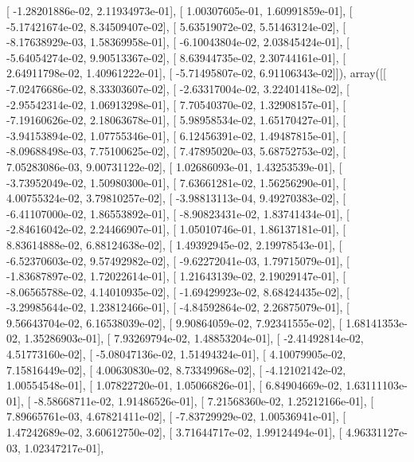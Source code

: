 \documentclass{article}
\begin{document}
       [ -1.28201886e-02,   2.11934973e-01],
       [  1.00307605e-01,   1.60991859e-01],
       [ -5.17421674e-02,   8.34509407e-02],
       [  5.63519072e-02,   5.51463124e-02],
       [ -8.17638929e-03,   1.58369958e-01],
       [ -6.10043804e-02,   2.03845424e-01],
       [ -5.64054274e-02,   9.90513367e-02],
       [  8.63944735e-02,   2.30744161e-01],
       [  2.64911798e-02,   1.40961222e-01],
       [ -5.71495807e-02,   6.91106343e-02]]), array([[ -7.02476686e-02,   8.33303607e-02],
       [ -2.63317004e-02,   3.22401418e-02],
       [ -2.95542314e-02,   1.06913298e-01],
       [  7.70540370e-02,   1.32908157e-01],
       [ -7.19160626e-02,   2.18063678e-01],
       [  5.98958534e-02,   1.65170427e-01],
       [ -3.94153894e-02,   1.07755346e-01],
       [  6.12456391e-02,   1.49487815e-01],
       [ -8.09688498e-03,   7.75100625e-02],
       [  7.47895020e-03,   5.68752753e-02],
       [  7.05283086e-03,   9.00731122e-02],
       [  1.02686093e-01,   1.43253539e-01],
       [ -3.73952049e-02,   1.50980300e-01],
       [  7.63661281e-02,   1.56256290e-01],
       [  4.00755324e-02,   3.79810257e-02],
       [ -3.98813113e-04,   9.49270383e-02],
       [ -6.41107000e-02,   1.86553892e-01],
       [ -8.90823431e-02,   1.83741434e-01],
       [ -2.84616042e-02,   2.24466907e-01],
       [  1.05010746e-01,   1.86137181e-01],
       [  8.83614888e-02,   6.88124638e-02],
       [  1.49392945e-02,   2.19978543e-01],
       [ -6.52370603e-02,   9.57492982e-02],
       [ -9.62272041e-03,   1.79715079e-01],
       [ -1.83687897e-02,   1.72022614e-01],
       [  1.21643139e-02,   2.19029147e-01],
       [ -8.06565788e-02,   4.14010935e-02],
       [ -1.69429923e-02,   8.68424435e-02],
       [ -3.29985644e-02,   1.23812466e-01],
       [ -4.84592864e-02,   2.26875079e-01],
       [  9.56643704e-02,   6.16538039e-02],
       [  9.90864059e-02,   7.92341555e-02],
       [  1.68141353e-02,   1.35286903e-01],
       [  7.93269794e-02,   1.48853204e-01],
       [ -2.41492814e-02,   4.51773160e-02],
       [ -5.08047136e-02,   1.51494324e-01],
       [  4.10079905e-02,   7.15816449e-02],
       [  4.00630830e-02,   8.73349968e-02],
       [ -4.12102142e-02,   1.00554548e-01],
       [  1.07822720e-01,   1.05066826e-01],
       [  6.84904669e-02,   1.63111103e-01],
       [ -8.58668711e-02,   1.91486526e-01],
       [  7.21568360e-02,   1.25212166e-01],
       [  7.89665761e-03,   4.67821411e-02],
       [ -7.83729929e-02,   1.00536941e-01],
       [  1.47242689e-02,   3.60612750e-02],
       [  3.71644717e-02,   1.99124494e-01],
       [  4.96331127e-03,   1.02347217e-01],
\end{document}
